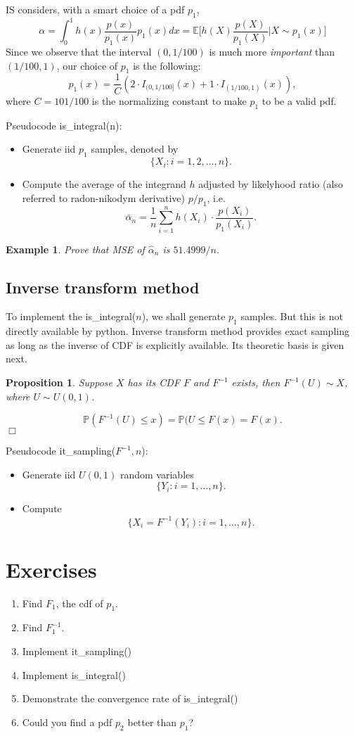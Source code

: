 \documentclass{article}
\newtheorem{proposition}[theorem]{Proposition}
\newtheorem{example}{Example}
\newenvironment{proof}{\noindent {\sc Proof:}}{$\Box$} %
\begin{document}
IS considers, with a smart choice of a pdf $p_{1}$, 
$$\alpha = \int_{0}^{1} h(x)\frac{p(x)}{p_{1}(x)} p_{1} (x) dx= 
\mathbb E \Big[h(X) \frac{p(X)}{p_{1}(X)} \Big| X\sim p_{1}(x) \Big] $$
Since we observe that the interval $(0, 1/100)$ is much more {\it important}
than $(1/100, 1)$, our choice of $p_{1}$ is the following:
$$p_{1} (x) = \frac{1}{C} (2 \cdot I_{(0, 1/100]} (x) + 1 \cdot I_{(1/100, 1)}(x)),$$
where
$C = 101/100$ is the normalizing constant to make $p_{1}$ to be a valid pdf.

Pseudocode is\_integral(n): 
\begin{itemize}
 \item Generate iid $p_{1}$ samples, denoted by
 $$\{X_{i}: i = 1, 2, \ldots, n\}.$$
 \item Compute the average of the integrand $h$ adjusted by 
 likelyhood ratio (also referred to radon-nikodym derivative) $p/p_{1}$, i.e.
 $$\bar \alpha_{n} = \frac 1 n \sum_{i=1}^{n} h(X_{i}) \cdot 
 \frac{p(X_{i})}{p_{1}(X_{i})}.$$
\end{itemize}

\begin{example}
 Prove that MSE of $\hat \alpha_{n}$ is $51.4999/n$.
\end{example}

\subsection{Inverse transform method}
To implement the is\_integral($n$), we  shall generate $p_{1}$ samples.
But this is not directly available by python. 
Inverse transform method provides exact sampling as long as the inverse of CDF is explicitly available. Its theoretic basis is given next.

\begin{proposition}
 Suppose $X$ has its CDF $F$ and $F^{-1}$ exists, then 
 $F^{-1}(U) \sim X$, where $U\sim U(0,1)$.
\end{proposition}
\begin{proof}
 $$\mathbb P(F^{-1}(U) \le x) = \mathbb P(U\le F(x) = F(x).$$
\end{proof}

Pseudocode it\_sampling($F^{-1}, n$):
\begin{itemize}
 \item Generate iid $U(0,1)$ random variables
 $$\{Y_{i}: i = 1, \ldots, n\}.$$
 \item Compute
 $$\{X_{i} = F^{-1}(Y_{i}): i = 1, \ldots, n\}.$$
\end{itemize}

\section{Exercises}
\begin{enumerate}
 \item Find $F_{1}$, the cdf of $p_{1}$.
 \item Find $F_{1}^{-1}$.
 \item Implement it\_sampling()
 \item Implement is\_integral()
 \item Demonstrate the convergence rate of is\_integral()
 \item Could you find a pdf $p_{2}$ better than $p_{1}$?
\end{enumerate}
\end{document}
